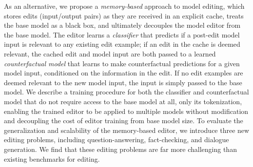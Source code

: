 As an alternative, we propose a \textit{memory-based} approach to model editing, which stores edits (input/output pairs) as they are received in an explicit cache, treats the base model as a black box, and ultimately decouples the model editor from the base model.
The editor learns a \textit{classifier} that predicts if a post-edit model input is relevant to any existing edit example; if an edit in the cache is deemed relevant, the cached edit and model input are both passed to a learned \textit{counterfactual model} that learns to make counterfactual predictions for a given model input, conditioned on the information in the edit. If no edit examples are deemed relevant to the new model input, the input is simply passed to the base model. We describe a training procedure for both the classifier and counterfactual model that do not require access to the base model at all, only its tokenization, enabling the trained editor to be applied to multiple models without modification and decoupling the cost of editor training from base model size. 
To evaluate the generalization and scalability of the memory-based editor, we introduce three new editing problems, including question-answering, fact-checking, and dialogue generation. We find that these editing problems are far more challenging than existing benchmarks for editing.

